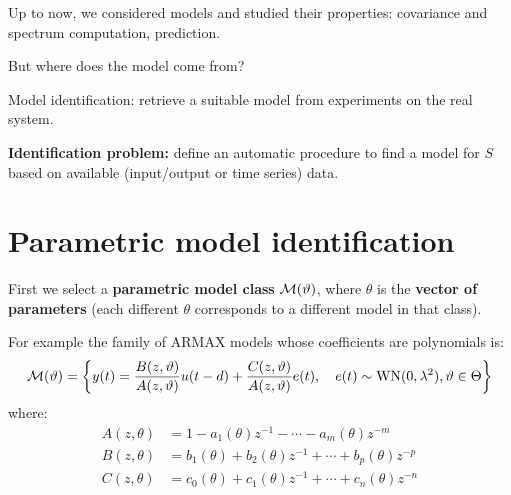 Up to now, we considered models and studied their properties: covariance and spectrum computation, prediction.

But where does the model come from?

Model identification: retrieve a suitable model from experiments on the real system.

\textbf{Identification problem:} define an automatic procedure to find a model for $S$ based on available (input/output or time series) data.





\section{Parametric model identification}

First we select a \textbf{parametric model class} $\mathcal{M}(\vartheta)$, where $\theta$ is the \textbf{vector of parameters} (each different $\theta$ corresponds to a different model in that class).

For example the family of ARMAX models whose coefficients are polynomials is:
$$
	\mathcal{M}(\vartheta)=\left\{y(t)=\frac{B(z, \vartheta)}{A(z, \vartheta)} u(t-d)+\frac{C(z, \vartheta)}{A(z, \vartheta)} e(t), \quad e(t) \sim \operatorname{WN}(0, \lambda^{2}), \vartheta\in\Theta\right\}
$$
where:
\begin{align*}
	A(z, \theta)&=1-a_{1}(\theta) z^{-1}-\cdots-a_{m}(\theta) z^{-m} \\
	B(z, \theta)&=b_{1}(\theta)+b_{2}(\theta) z^{-1}+\cdots+b_{p}(\theta) z^{-p}\\
	C(z, \theta)&=c_0(\theta)+c_{1}(\theta) z^{-1}+\cdots+c_{n}(\theta) z^{-n}
\end{align*}

